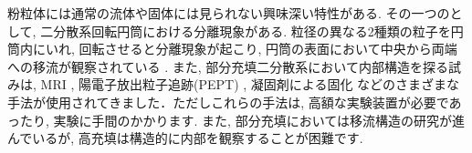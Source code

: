 \documentclass[prl,twocolumn,superscriptaddress]{revtex4}
\begin{document}
粉粒体には通常の流体や固体には見られない興味深い特性がある. その一つのとして, 二分散系回転円筒における分離現象がある. 粒径の異なる2種類の粒子を円筒内にいれ, 回転させると分離現象が起こり, 円筒の表面において中央から両端への移流が観察されている \cite{Inagaki15:bidisperse}. また, 部分充填二分散系において内部構造を探る試みは, MRI \cite{Hill97:MRI},  陽電子放出粒子追跡(PEPT) \cite{Ding01:PEPT}, 凝固剤による固化 \cite{Santomaso04:solid}などのさまざまな手法が使用されてきました．ただしこれらの手法は, 高額な実験装置が必要であったり, 実験に手間のかかります. また, 部分充填においては移流構造の研究が進んでいるが, 高充填は構造的に内部を観察することが困難です. \\

\end{document}
